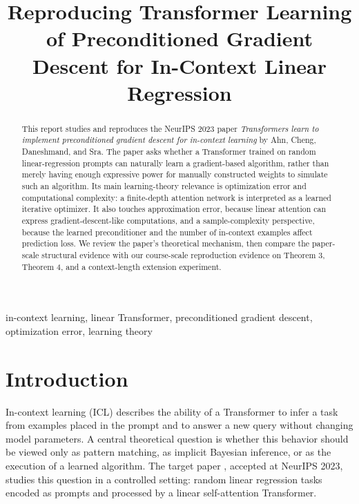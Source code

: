 \documentclass[conference]{IEEEtran}
\begin{document}
\title{Reproducing Transformer Learning of Preconditioned Gradient Descent for In-Context Linear Regression}

\author{
\and
{}
\and
{}
\and
{}
}

\maketitle

\begin{abstract}
This report studies and reproduces the NeurIPS 2023 paper \emph{Transformers learn to implement preconditioned gradient descent for in-context learning} by Ahn, Cheng, Daneshmand, and Sra. The paper asks whether a Transformer trained on random linear-regression prompts can naturally learn a gradient-based algorithm, rather than merely having enough expressive power for manually constructed weights to simulate such an algorithm. Its main learning-theory relevance is optimization error and computational complexity: a finite-depth attention network is interpreted as a learned iterative optimizer. It also touches approximation error, because linear attention can express gradient-descent-like computations, and a sample-complexity perspective, because the learned preconditioner and the number of in-context examples affect prediction loss. We review the paper's theoretical mechanism, then compare the paper-scale structural evidence with our course-scale reproduction evidence on Theorem 3, Theorem 4, and a context-length extension experiment.
\end{abstract}

\begin{IEEEkeywords}
in-context learning, linear Transformer, preconditioned gradient descent, optimization error, learning theory
\end{IEEEkeywords}

\section{Introduction}
In-context learning (ICL) describes the ability of a Transformer to infer a task from examples placed in the prompt and to answer a new query without changing model parameters. A central theoretical question is whether this behavior should be viewed only as pattern matching, as implicit Bayesian inference, or as the execution of a learned algorithm. The target paper \cite{ahn2023preconditioned}, accepted at NeurIPS 2023, studies this question in a controlled setting: random linear regression tasks encoded as prompts and processed by a linear self-attention Transformer.
\end{document}

